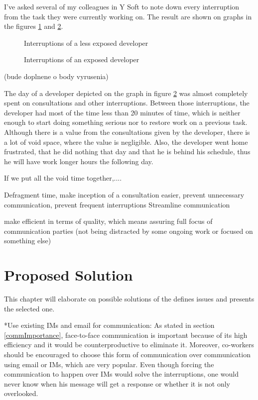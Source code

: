 \documentclass[11pt,singleside]{myfithesis2}
\makeatletter
\newcommand{\pict}[4]{
	\begin{figure}[h!]
  		\vspace{-7px}
  		\centerline{\fcolorbox{darkgray}{palegray}{\texttt{[image: \#2]}}}
  		\caption{#1}
  		\label{#4}
	\end{figure}
}
\renewcommand\paragraph{
   \vspace{-10pt}
   \@startsection{paragraph}{4}{0mm}
      {\baselineskip}
      {- 5pt}
      {\normalfont\normalsize\bfseries}
}
\makeatother
\begin{document}
I've asked several of my colleagues in Y Soft to note down every interruption from the task they were currently working on. The result are shown on graphs in the figures \ref{pic:originalStatesNormal} and \ref{pic:originalStatesExposed}.

\pict{Interruptions of a less exposed developer}{data/originalStatesNormal.png}{width=0.8\textwidth}{pic:originalStatesNormal}

\pict{Interruptions of an exposed developer}{data/originalStatesExposed.png}{width=0.8\textwidth}{pic:originalStatesExposed}

(bude doplnene o body vyrusenia)

The day of a developer depicted on the graph in figure \ref{pic:originalStatesExposed} was almost completely spent on consultations and other interruptions. Between those interruptions, the developer had most of the time less than 20 minutes of time, which is neither enough to start doing something serious nor to restore work on a previous task. Although there is a value from the consultations given by the developer, there is a lot of void space, where the value is negligible. Also, the developer went home frustrated, that he did nothing that day and that he is behind his schedule, thus he will have work longer hours the following day.

If we put all the void time together,....



Defragment time, make inception of a consultation easier, prevent unnecessary communication, prevent frequent interruptions
Streamline communication

make efficient in terms of quality, which means assuring full focus of communication parties (not being distracted by some ongoing work or focused on something else)

\chapter{Proposed Solution}
This chapter will elaborate on possible solutions of the defines issues and presents the selected one.

\paragraph*{Use existing IMs and email for communication: } As stated in section \ref{commImportance}, face-to-face communication is important because of its high efficiency and it would be counterproductive to eliminate it. Moreover, co-workers should be encouraged to choose this form of communication over communication using email or IMs, which are very popular. Even though forcing the communication to happen over IMs would solve the interruptions, one would never know when his message will get a response or whether it is not only overlooked.
\end{document}

